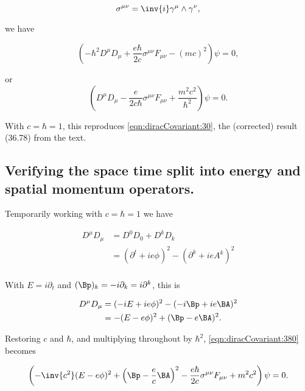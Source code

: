 \begin{equation}\label{eqn:diracCovariant:360}
\sigma^{\mu \nu} = \inv{i} \gamma^\mu \wedge \gamma^\nu,
\end{equation}

we have

\begin{equation}\label{eqn:diracCovariant:380}
\left( -\hbar^2 D^\mu D_\mu + \frac{e \hbar}{ 2 c } \sigma^{\mu\nu} F_{\mu\nu} - (m c)^2 \right) \psi  = 0,
\end{equation}

or
\begin{equation}\label{eqn:diracCovariant:380b}
\left( D^\mu D_\mu - \frac{e }{ 2 c \hbar } \sigma^{\mu\nu} F_{\mu\nu} + \frac{m^2 c^2}{\hbar^2} \right) \psi  = 0.
\end{equation}

With $c = \hbar = 1$, this reproduces \ref{eqn:diracCovariant:30}, the (corrected) result (36.78) from the text.

\subsection{Verifying the space time split into energy and spatial momentum operators.}

Temporarily working with $c = \hbar = 1$ we have

\begin{align*}
D^\mu D_\mu 
&= D^0 D_0 + D^k D_k \\
&= (\partial^t + i e \phi)^2 - (\partial^k + i e A^k)^2 \\
\end{align*}

With $E = i \partial_t$ and $(\Bp)_k = -i \partial_k = i \partial^k$, this is

\begin{align*}
D^\mu D_\mu 
&= (-i E + i e \phi)^2 - (-i \Bp + i e \BA)^2 \\
&= -(E - e \phi)^2 + (\Bp - e \BA)^2.
\end{align*}

Restoring $c$ and $\hbar$, and multiplying throughout by $\hbar^2$, \ref{eqn:diracCovariant:380} becomes

\begin{equation}\label{eqn:diracCovariant:380c}
\left( 
-\inv{c^2 } (E - e \phi)^2 + \left(\Bp - \frac{e }{c} \BA \right)^2
- \frac{ e \hbar }{ 2 c } \sigma^{\mu\nu} F_{\mu\nu} + m^2 c^2 \right) \psi  = 0.
\end{equation}

